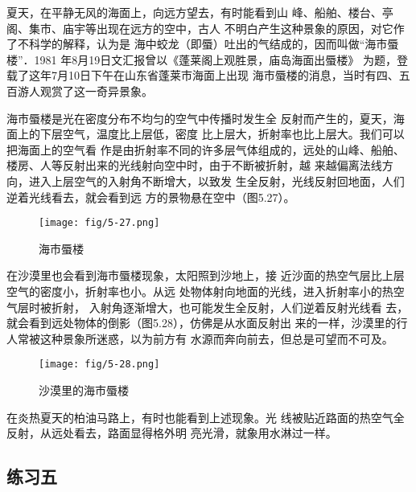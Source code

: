 夏天，在平静无风的海面上，向远方望去，有时能看到山
峰、船舶、楼台、亭阁、集市、庙宇等出现在远方的空中，古人
不明白产生这种景象的原因，对它作了不科学的解释，认为是
海中蛟龙（即蜃）吐出的气结成的，因而叫做“海市蜃楼”．1981
年8月19日文汇报曾以《蓬莱阁上观胜景，庙岛海面出蜃楼》
为题，登载了这年7月10日下午在山东省蓬莱市海面上出现
海市蜃楼的消息，当时有四、五百游人观赏了这一奇异景象。

海市蜃楼是光在密度分布不均匀的空气中传播时发生全
反射而产生的，夏天，海面上的下层空气，温度比上层低，密度
比上层大，折射率也比上层大。我们可以把海面上的空气看
作是由折射率不同的许多层气体组成的，远处的山峰、船舶、
楼房、人等反射出来的光线射向空中时，由于不断被折射，越
来越偏离法线方向，进入上层空气的入射角不断增大，以致发
生全反射，光线反射回地面，人们逆着光线看去，就会看到远
方的景物悬在空中（图5.27）。
\begin{figure}[htp]\centering
    \texttt{[image: fig/5-27.png]}
    \caption{海市蜃楼}
    \end{figure}

在沙漠里也会看到海市蜃楼现象，太阳照到沙地上，接
近沙面的热空气层比上层空气的密度小，折射率也小。从远
处物体射向地面的光线，进入折射率小的热空气层时被折射，
入射角逐渐增大，也可能发生全反射，人们逆着反射光线看
去，就会看到远处物体的倒影（图5.28），仿佛是从水面反射出
来的一样，沙漠里的行人常被这种景象所迷惑，以为前方有
水源而奔向前去，但总是可望而不可及。
\begin{figure}[htp]\centering
    \texttt{[image: fig/5-28.png]}
    \caption{沙漠里的海市蜃楼}
    \end{figure}

在炎热夏天的柏油马路上，有时也能看到上述现象。光
线被贴近路面的热空气全反射，从远处看去，路面显得格外明
亮光滑，就象用水淋过一样。

\subsection*{练习五}

